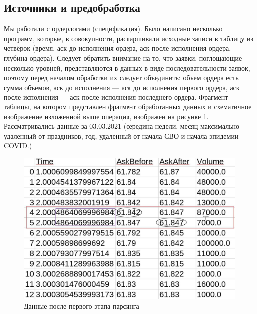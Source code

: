 \subsection{Источники и предобработка}
Мы работали с ордерлогами (\href{https://fs.moex.com/f/3198/specifikacija-formata-dannyh.pdf}{спецификация}). Было написано несколько 
\href{https://github.com/VsevolodZaostrovsky/OWModel/tree/main/New%20data/data%20preparing}{программ},
которые, в совокупности, распаршивали исходные записи в таблицу из четвёрок (время, аск до исполнения ордера, аск после исполнения ордера, глубина ордера). 
Следует обратить внимание на то, что заявки, поглощающие несколько уровней, представляются в данных в виде последовательности заявок, поэтому 
перед началом обработки их следует объединить: объем ордера есть сумма объемов, аск до исполнения --- аск до исполнения первого ордера,
аск после исполнения --- аск после исполнения последнего ордера. Фрагмент таблицы, на котором представлен фрагмент обработанных данных
и схематичное изображение изложенной выше операции, изображен на рисунке \ref{datacsv}.
 Рассматривались данные за 
03.03.2021 (середина недели, месяц максимально удаленный от праздников, 
год, удаленный от начала СВО и начала эпидемии COVID.)
\begin{figure}
    \includegraphics[scale=0.35]{fig/datscsv.jpg}
    \caption{Данные после первого этапа парсинга}
    \label{datacsv}
\end{figure}

